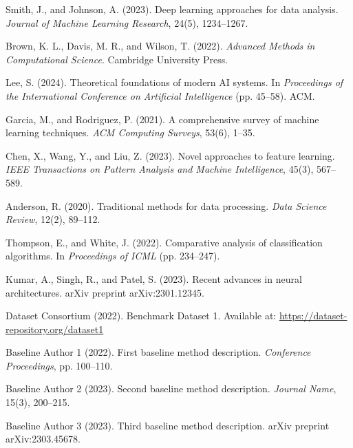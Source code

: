 \documentclass[12pt,a4paper]{article}
\theoremstyle{definition}
\theoremstyle{remark}
\begin{document}

\begin{thebibliography}{99}

Smith, J., and Johnson, A. (2023). 
Deep learning approaches for data analysis.
\emph{Journal of Machine Learning Research}, 24(5), 1234--1267.

Brown, K. L., Davis, M. R., and Wilson, T. (2022).
\emph{Advanced Methods in Computational Science}.
Cambridge University Press.

Lee, S. (2024).
Theoretical foundations of modern AI systems.
In \emph{Proceedings of the International Conference on Artificial Intelligence} (pp. 45--58). ACM.

Garcia, M., and Rodriguez, P. (2021).
A comprehensive survey of machine learning techniques.
\emph{ACM Computing Surveys}, 53(6), 1--35.

Chen, X., Wang, Y., and Liu, Z. (2023).
Novel approaches to feature learning.
\emph{IEEE Transactions on Pattern Analysis and Machine Intelligence}, 45(3), 567--589.

Anderson, R. (2020).
Traditional methods for data processing.
\emph{Data Science Review}, 12(2), 89--112.

Thompson, E., and White, J. (2022).
Comparative analysis of classification algorithms.
In \emph{Proceedings of ICML} (pp. 234--247).

Kumar, A., Singh, R., and Patel, S. (2023).
Recent advances in neural architectures.
arXiv preprint arXiv:2301.12345.

Dataset Consortium (2022).
Benchmark Dataset 1.
Available at: \url{https://dataset-repository.org/dataset1}

Baseline Author 1 (2022).
First baseline method description.
\emph{Conference Proceedings}, pp. 100--110.

Baseline Author 2 (2023).
Second baseline method description.
\emph{Journal Name}, 15(3), 200--215.

Baseline Author 3 (2023).
Third baseline method description.
arXiv preprint arXiv:2303.45678.

\end{thebibliography}
\end{document}
